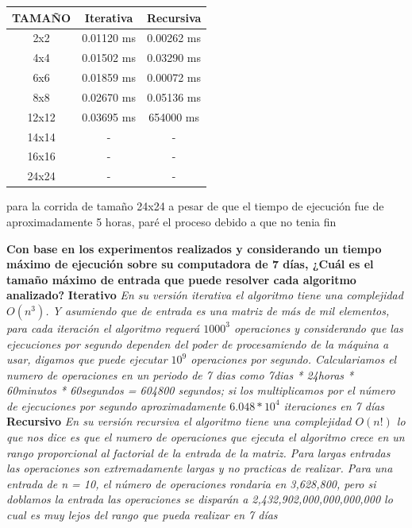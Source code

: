 \documentclass{article}
\begin{document}
\begin{question}
  \begin{center}
    \begin{tabular}{||c c c||} 
      \hline
      TAMAÑO & Iterativa & Recursiva \\ [0.5ex] 
      \hline\hline
      2x2 & 0.01120 ms & 0.00262 ms \\ 
      \hline
      4x4 & 0.01502 ms & 0.03290 ms \\
      \hline
      6x6 & 0.01859 ms & 0.00072 ms \\
      \hline
      8x8 & 0.02670 ms & 0.05136 ms \\
      \hline
      12x12 & 0.03695 ms & 654000 ms \\
      \hline
      14x14 & - & - \\
      \hline
      16x16 & - & - \\
      \hline
      24x24 & - & - \\
      \hline
    \end{tabular}
  \end{center}

  para la corrida de tamaño 24x24 a pesar de que el tiempo de ejecución fue de aproximadamente 5 horas, paré el proceso debido a que no tenia fin
\end{question}

\begin{question}
  \textbf{Con base en los experimentos realizados y considerando un tiempo máximo de ejecución sobre su computadora de 7 días, ¿Cuál es el tamaño máximo de entrada que puede resolver cada algoritmo analizado?}
  \textbf{Iterativo} \textit{En su versión iterativa el algoritmo tiene una complejidad $O(n^{3})$. Y asumiendo que de entrada es una matriz de más de mil elementos, para cada iteración el algoritmo requerá $1000^{3}$ operaciones y considerando que las ejecuciones por segundo dependen del poder de procesamiendo de la máquina a usar, digamos que puede ejecutar $10^{9}$ operaciones por segundo. Calculariamos el numero de operaciones en un periodo de 7 dias como 7dias * 24horas * 60minutos * 60segundos = 604800 segundos; si los multiplicamos por el número de ejecuciones por segundo aproximadamente $6.048 * 10^{4}$ iteraciones en 7 días}\\
  \textbf{Recursivo} \textit{En su versión recursiva el algoritmo tiene una complejidad $O(n!)$ lo que nos dice es que el numero de operaciones que ejecuta el algoritmo crece en un rango proporcional al factorial de la entrada de la matriz. Para largas entradas las operaciones son extremadamente largas y no practicas de realizar. Para una entrada de n = 10, el número de operaciones rondaria en 3,628,800, pero si doblamos la entrada las operaciones se disparán a 2,432,902,000,000,000,000 lo cual es muy lejos del rango que pueda realizar en 7 días}
\end{question}
\end{document}
